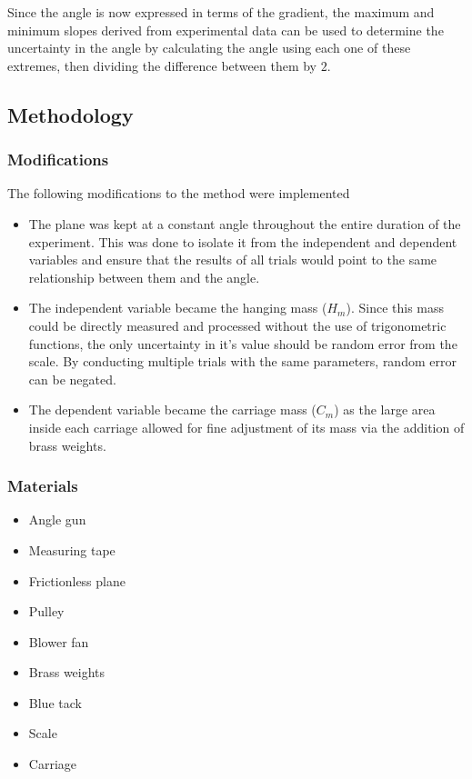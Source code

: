 \documentclass[11pt,a4paper]{article}
\begin{document}
Since the angle is now expressed in terms of the gradient, the maximum and minimum slopes derived from experimental data can be used to determine the uncertainty in the angle by calculating the angle using each one of these extremes, then dividing the difference between them by $2$.




\subsection{Methodology}

\subsubsection{Modifications}


The following modifications to the method were implemented
\begin{itemize}
	\item The plane was kept at a constant angle throughout the entire duration of the experiment. This was done to isolate it from the independent and dependent variables and ensure that the results of all trials would point to the same relationship between them and the angle.
	\item The independent variable became the hanging mass ($H_m$). Since this mass could be directly measured and processed without the use of trigonometric functions, the only uncertainty in it's value should be random error from the scale. By conducting multiple trials with the same parameters, random error can be negated. 
	\item The dependent variable became the carriage mass ($C_m$) as the large area inside each carriage allowed for fine adjustment of its mass via the addition of brass weights. 
\end{itemize}

\subsubsection{Materials}
\begin{itemize}
	\item Angle gun 
	\item Measuring tape
	\item Frictionless plane
	\item Pulley
	\item Blower fan
	\item Brass weights
	\item Blue tack 
	\item Scale
	\item Carriage
\end{itemize}
\end{document}
